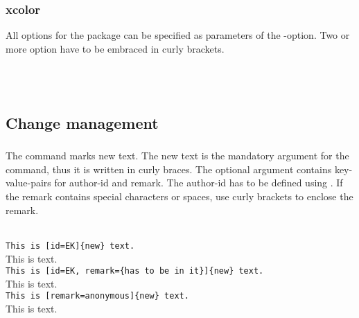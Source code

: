 \subsubsection{xcolor}

All options for the  package can be specified as parameters of the -option.
Two or more option have to be embraced in curly brackets.

\begin{chusage}
		\>\\
	\usageexample
		\>\\
		\>
\end{chusage}



\subsection{Change management}
\label{sec:user:changemanagement}

\subsubsection{}
\DescribeMacro{\added}

The command  marks new text.
The new text is the mandatory argument for the command, thus it is written in curly braces.
The optional argument contains key-value-pairs for author-id and remark.
The author-id has to be defined using .
If the remark contains special characters or spaces, use curly brackets to enclose the remark.

\begin{chusage}
		\>\\
	\usageexample
		\>\texttt{This is [id=EK]\{new\} text.}\\
		\>This is  text.\\
		\>\texttt{This is [id=EK, remark=\{has to be in it\}]\{new\} text.}\\
		\>This is  text.\\
		\>\texttt{This is [remark=anonymous]\{new\} text.}\\
		\>This is  text.
\end{chusage}


